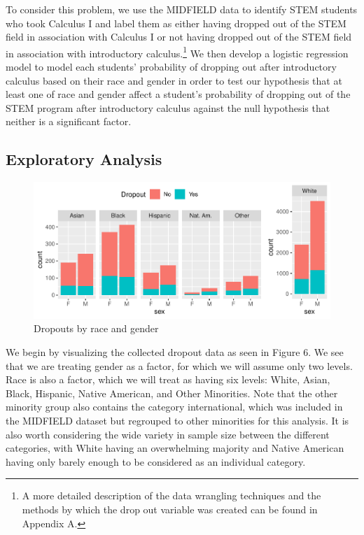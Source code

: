 \documentclass[]{article}
\begin{document}
To consider this problem, we use the MIDFIELD data to identify STEM
students who took Calculus I and label them as either having dropped out
of the STEM field in association with Calculus I or not having dropped
out of the STEM field in association with introductory
calculus.\footnote{A more detailed description of the data wrangling techniques and the methods by which the drop out variable was created can be found in Appendix A.}
We then develop a logistic regression model to model each students'
probability of dropping out after introductory calculus based on their
race and gender in order to test our hypothesis that at least one of
race and gender affect a student's probability of dropping out of the
STEM program after introductory calculus against the null hypothesis
that neither is a significant factor.

\subsection{Exploratory Analysis}\label{exploratory-analysis}

\begin{figure}
\centering
\includegraphics{Stat_461_Final_Project_Report_files/figure-latex/comboplots-1.pdf}
\caption{Dropouts by race and gender}
\end{figure}

We begin by visualizing the collected dropout data as seen in Figure 6.
We see that we are treating gender as a factor, for which we will assume
only two levels. Race is also a factor, which we will treat as having
six levels: White, Asian, Black, Hispanic, Native American, and Other
Minorities. Note that the other minority group also contains the
category international, which was included in the MIDFIELD dataset but
regrouped to other minorities for this analysis. It is also worth
considering the wide variety in sample size between the different
categories, with White having an overwhelming majority and Native
American having only barely enough to be considered as an individual
category.
\end{document}
